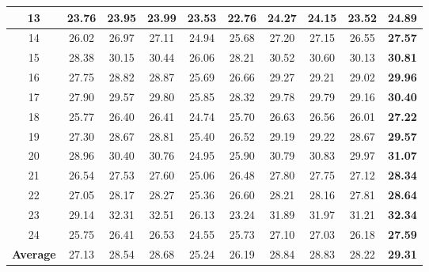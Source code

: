 \documentclass[10pt,twocolumn,letterpaper,sort&compress]{article}
\begin{document}
\begin{table}
\begin{center}
\begin{tabular}{|c||c|c|c|c|c|c|c|c|c|}
\hline
13 & 23.76 & 23.95 & 23.99 & 23.53 & 22.76 & 24.27 & 24.15 & 23.52 & \textbf{24.89}
\\
\hline
14 & 26.02 & 26.97 & 27.11 & 24.94  & 25.68 & 27.20 & 27.15 & 26.55 & \textbf{27.57}
\\
\hline
15 & 28.38 & 30.15 & 30.44 & 26.06 & 28.21 & 30.52 & 30.60 & 30.13 & \textbf{30.81}
\\
\hline
16 & 27.75 & 28.82 & 28.87 & 25.69 & 26.66 & 29.27 & 29.21 & 29.02 & \textbf{29.96}
\\
\hline
17 & 27.90 & 29.57 & 29.80 & 25.85 & 28.32 & 29.78 & 29.79 & 29.16 & \textbf{30.40}
\\
\hline
18 & 25.77 & 26.40 & 26.41 & 24.74 & 25.70 & 26.63 & 26.56 & 26.01 & \textbf{27.22}
\\
\hline
19 & 27.30 & 28.67 & 28.81 & 25.40 & 26.52 & 29.19 & 29.22 & 28.67 & \textbf{29.57}
\\
\hline
20 & 28.96 & 30.40 & 30.76 & 24.95 & 25.90 & 30.79 & 30.83 & 29.97 & \textbf{31.07}
\\
\hline
21 & 26.54 & 27.53 & 27.60 & 25.06 & 26.48 & 27.80 & 27.75 & 27.12 & \textbf{28.34}
\\
\hline
22 & 27.05 & 28.17 & 28.27 & 25.36 & 26.60 & 28.21 & 28.16 & 27.81 & \textbf{28.64}
\\
\hline
23 & 29.14 & 32.31 & 32.51 & 26.13 & 23.24 & 31.89 & 31.97 & 31.21 & \textbf{32.34}
\\
\hline
24 & 25.75 & 26.41 & 26.53 & 24.55 & 25.73 & 27.10 & 27.03 & 26.18 & \textbf{27.59}
\\
\hline
\textbf{Average} & 27.13 & 28.54 & 28.68 & 25.24 & 26.19 & 28.84 & 28.83 & 28.22 & \textbf{29.31}
\\
\hline
\end{tabular}
\end{center}
\vspace{-3mm}
\end{table}
\end{document}
